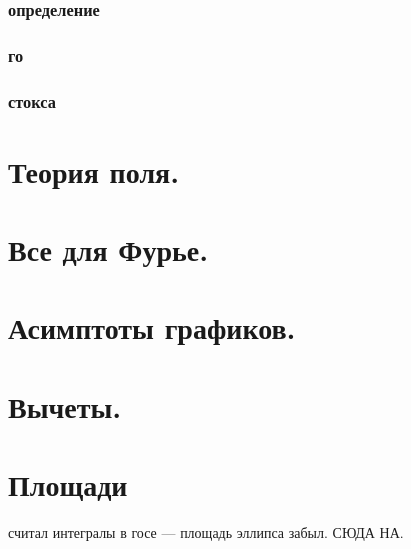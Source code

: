 \subsubsection{определение}
\subsubsection{го}
\subsubsection{стокса}

\section{Теория поля.}

\section{Все для Фурье.}

\section{Асимптоты графиков.}

\section{Вычеты.}


\section{Площади}

считал интегралы в госе --- площадь эллипса забыл. СЮДА НА.
